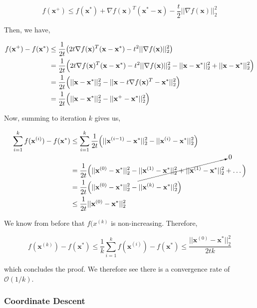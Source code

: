 \documentclass[11pt]{amsart}
\begin{document}
$$f(\mathbf{x^+}) \leq f(\mathbf{x^*}) + \nabla f(\mathbf{x})^T(\mathbf{x^*} - \mathbf{x}) - \frac{t}{2}||\nabla f(\mathbf{x})||_2^2$$

Then, we have,

\begin{align}
f(\mathbf{x^+}) - f(\mathbf{x}^*) &\leq \frac{1}{2t}\big(2t \nabla f(\mathbf{x})^T(\mathbf{x} - \mathbf{x}^*) - t^2||\nabla f(\mathbf{x})||_2^2\big) \notag \\
&= \frac{1}{2t}\Big(2t\nabla f(\mathbf{x})^T (\mathbf{x} - \mathbf{x}^*) - t^2 ||\nabla f(\mathbf{x})||_2^2 - ||\mathbf{x} - \mathbf{x}^*||_2^2 + ||\mathbf{x} - \mathbf{x}^*||_2^2\Big) \notag \\
&= \frac{1}{2t}\Big(||\mathbf{x} - \mathbf{x}^*||_2^2 - ||\mathbf{x} - t\nabla f(\mathbf{x})^T - \mathbf{x}^*||_2^2\Big) \notag \\
&= \frac{1}{2t}\Big(||\mathbf{x} - \mathbf{x}^*||_2^2 - ||\mathbf{x}^+ - \mathbf{x}^*||_2^2\Big) \notag
\end{align}

Now, summing to iteration $k$ gives us,

\begin{align}
\sum_{i=1}^k f(\mathbf{x}^{(i)}) - f(\mathbf{x}^*) &\leq \sum_{i=1}^k \frac{1}{2t}\Big(||\mathbf{x}^{(i-1)} - \mathbf{x}^*||_2^2 - ||\mathbf{x}^{(i)} - \mathbf{x}^*||_2^2\Big) \notag \\
&= \frac{1}{2t}\Big(||\mathbf{x}^{(0)} - \mathbf{x}^*||_2^2 - \cancelto{0}{||\mathbf{x}^{(1)} - \mathbf{x}^*||_2^2 + ||\mathbf{x}^{(1)} - \mathbf{x}^*||_2^2} + \dots\Big)\notag \\
&= \frac{1}{2t}\Big(||\mathbf{x}^{(0)} - \mathbf{x}^*||_2^2 - ||\mathbf{x}^{(k)} - \mathbf{x}^*||_2^2\Big) \notag \\
&\leq \frac{1}{2t}||\mathbf{x}^{(0)} - \mathbf{x}^*||_2^2 \notag
\end{align}

We know from before that $f(x^{(k)}$ is non-increasing. Therefore,

$$f(\mathbf{x}^{(k)}) - f(\mathbf{x}^{*}) \leq \frac{1}{k}\sum_{i=1}^k f(\mathbf{x}^{(i)}) - f(\mathbf{x}^*) \leq \frac{||\mathbf{x}^{(0)} - \mathbf{x}^*||_2^2}{2tk} $$

which concludes the proof. We therefore see there is a convergence rate of $\mathcal{O}(1/k)$.

\subsubsection{Coordinate Descent}
\end{document}

